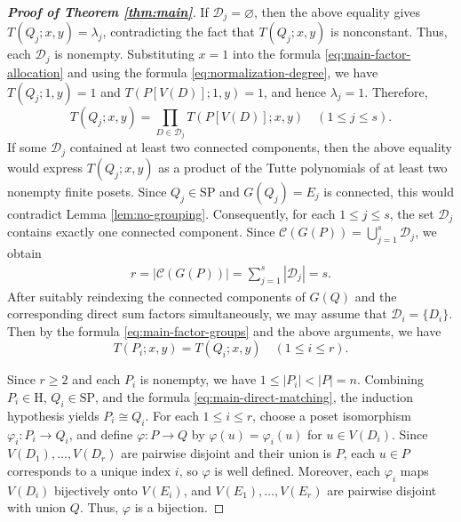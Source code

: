 \documentclass[11pt,a4paper]{article}
\begin{document}
\begin{proof}[\rm\textbf{Proof of Theorem \ref{thm:main}}]
If $\mathcal D_j=\varnothing$, then the above equality gives
$T(Q_j;x,y)=\lambda_j$, contradicting the fact that $T(Q_j;x,y)$ is nonconstant.
Thus, each $\mathcal D_j$ is nonempty.
Substituting $x=1$ into the formula \eqref{eq:main-factor-allocation}
and using the formula \eqref{eq:normalization-degree}, we have $T(Q_j;1,y)=1$ and $T(P[V(D)];1,y)=1$,
and hence $\lambda_j=1$. Therefore,
\begin{equation}\label{eq:main-factor-groups}
T(Q_j;x,y)=\prod_{D\in\mathcal D_j}T(P[V(D)];x,y)\quad(1\leq j\leq s).
\end{equation}
If some $\mathcal D_j$ contained at least two connected components,
then the above equality would express $T(Q_j;x,y)$ as a product of the Tutte polynomials
of at least two nonempty finite posets.
Since $Q_j\in\mathrm{SP}$ and $G(Q_j)=E_j$ is connected,
this would contradict Lemma \ref{lem:no-grouping}.
Consequently, for each $1\leq j\leq s$,
the set $\mathcal D_j$ contains exactly one connected component.
Since $\mathcal C(G(P))=\bigcup_{j=1}^{s}\mathcal D_j$, we obtain 
\begin{eqnarray*}
r=|\mathcal C(G(P))|=\sum_{j=1}^{s}|\mathcal D_j|=s.
\end{eqnarray*}
After suitably reindexing the connected components of $G(Q)$
and the corresponding direct sum factors simultaneously,
we may assume that $\mathcal D_i=\{D_i\}$.
Then by the formula \eqref{eq:main-factor-groups} and the above arguments, we have
\begin{equation}\label{eq:main-direct-matching}
T(P_i;x,y)=T(Q_i;x,y)\quad(1\leq i\leq r).
\end{equation}

Since $r\geq2$ and each $P_i$ is nonempty, we have $1\leq|P_i|<|P|=n$.
Combining $P_i\in\mathrm H$, $Q_i\in\mathrm{SP}$,
and the formula \eqref{eq:main-direct-matching}, the induction hypothesis yields $P_i\cong Q_i$.
For each $1\leq i\leq r$, choose a poset isomorphism
$\varphi_i:P_i\to Q_i$, and define $\varphi:P\to Q$ by
$\varphi(u)=\varphi_i(u)$ for $u\in V(D_i)$.
Since $V(D_1),\ldots,V(D_r)$ are pairwise disjoint
and their union is $P$, each $u\in P$ corresponds to a unique index $i$,
so $\varphi$ is well defined.
Moreover, each $\varphi_i$ maps $V(D_i)$ bijectively onto $V(E_i)$,
and $V(E_1),\ldots,V(E_r)$ are pairwise disjoint with union $Q$.
Thus, $\varphi$ is a bijection.


\end{proof}
\end{document}
